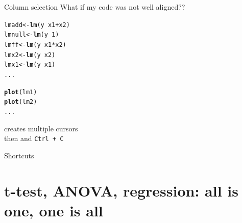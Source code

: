 \documentclass[10pt]{beamer}\usepackage[]{graphicx}\usepackage[]{color}
\makeatletter
\newcommand{\hlnum}[1]{\textcolor[rgb]{0.686,0.059,0.569}{#1}}%
\newcommand{\hlopt}[1]{\textcolor[rgb]{0,0,0}{#1}}%
\newcommand{\hlstd}[1]{\textcolor[rgb]{0.345,0.345,0.345}{#1}}%
\newcommand{\hlkwb}[1]{\textcolor[rgb]{0.69,0.353,0.396}{#1}}%
\newcommand{\hlkwd}[1]{\textcolor[rgb]{0.737,0.353,0.396}{\textbf{#1}}}%
\newenvironment{kframe}{%
 \def\at@end@of@kframe{}%
 \ifinner\ifhmode%
  \def\at@end@of@kframe{\end{minipage}}%
  \begin{minipage}{\columnwidth}%
 \fi\fi%
 \def\FrameCommand##1{\hskip\@totalleftmargin \hskip-\fboxsep
 \colorbox{shadecolor}{##1}\hskip-\fboxsep
     \hskip-\linewidth \hskip-\@totalleftmargin \hskip\columnwidth}%
 \MakeFramed {\advance\hsize-\width
   \@totalleftmargin\z@ \linewidth\hsize
   \@setminipage}}%
 {\par\unskip\endMakeFramed%
 \at@end@of@kframe}
\newenvironment{knitrout}{}{} %
\makeatother
\begin{document}
\begin{frame}[fragile]{Column selection}
What if my code was not well aligned??

\begin{knitrout}
\color{fgcolor}\begin{kframe}
\begin{alltt}
\hlstd{lmadd} \hlkwb{<-} \hlkwd{lm}\hlstd{(y} \hlopt{~} \hlstd{x1} \hlopt{+} \hlstd{x2)}
\hlstd{lmnull} \hlkwb{<-} \hlkwd{lm}\hlstd{(y} \hlopt{~} \hlnum{1}\hlstd{)}
\hlstd{lmff} \hlkwb{<-} \hlkwd{lm}\hlstd{(y} \hlopt{~} \hlstd{x1}\hlopt{*}\hlstd{x2)}
\hlstd{lmx2}\hlkwb{<-} \hlkwd{lm}\hlstd{(y} \hlopt{~} \hlstd{x2)}
\hlstd{lmx1}  \hlkwb{<-} \hlkwd{lm}\hlstd{(y} \hlopt{~} \hlstd{x1)}
\hlstd{...}

\hlkwd{plot}\hlstd{(lm1)}
\hlkwd{plot}\hlstd{(lm2)}
\hlstd{...}
\end{alltt}
\end{kframe}
\end{knitrout}

\pause

 creates multiple cursors\\

then  and \texttt{Ctrl + C}
\end{frame}


\begin{frame}{Shortcuts}


\end{frame}

\section{t-test, ANOVA, regression: all is one, one is all}
\end{document}
